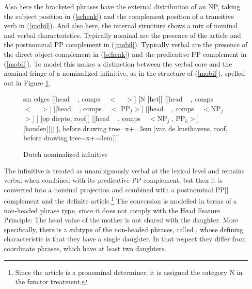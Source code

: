 \documentclass[output=paper]{langsci/langscibook}
\begin{document}
\noindent
Also here the bracketed phrases have the external distribution of an NP, 
taking the subject position in (\ref{schenk}) and 
the complement position of a transitive verb in (\ref{mobil}). 
And also here, the internal structure shows a mix of nominal and verbal
characteristics. 
Typically nominal are the presence of the article and the postnominal PP
complement in (\ref{mobil}). 
Typically verbal are the presence of the direct object complement in (\ref{schenk})
and the predicative PP complement in (\ref{mobil}). 
To model this \citet{VanEynde19} makes a distinction between the verbal core 
and the nominal fringe of a nominalized infinitive, as in the structure of 
(\ref{mobil}), spelled out in Figure \ref{kust}.  

\begin{figure}
	\centering
	\begin{forest}
sm edges
[{[{\sc head} ~   , {\sc comps} ~ $<$ ~ $>$]}
	[N [het]]
	[{[{\sc head} ~  , {\sc comps} ~ $<$ ~ $>$]}
		[{[{\sc head} ~  , {\sc comps} ~ $<$ PP$_{j}$$>$]}
			[{[{\sc head} ~   , {\sc comps} ~ $<$NP$_{j}$$>$]}
			[ [op diepte, roof]]
			[{[{\sc head} ~  , {\sc comps} ~ $<$NP$_{j}$ ,  PP$_{k}$$>$]} [houden]]]]
		[, before drawing tree={x+=3em} [van de kusthavens, roof, before drawing tree={x+=3em}]]]]
	\end{forest}
	\caption{\label{kust} Dutch nominalized infinitive}
\end{figure}   

The infinitive is treated as unambiguously verbal at the lexical level and 
remains verbal when combined with its predicative PP complement, but then it  
is converted into a nominal projection and combined with a postnominal PP[]
complement and the definite article.\footnote{Since the article is a pronominal 
determiner, it is assigned the category N in the functor treatment.}     
The conversion is modelled in terms of a non-headed phrase type, 
since it does not comply with the Head Feature Principle: 
The {\sc head} value of the mother is not shared with the daughter.  
More specifically, there is a subtype of the non-headed phrases, called , 
whose defining characteristic is that they have a single daughter. 
In that respect they differ from coordinate phrases, which have at least two daughters.  

\begin{exe} 
\ex\label{conv} 
\begin{avm} 
\end{avm}
\end{exe}
\end{document}
